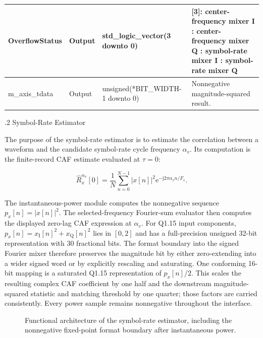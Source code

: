 \begin{table}[H]
\begin{center}
\begin{tabularx}{\textwidth}{|L{0.24\textwidth}|L{0.13\textwidth}|L{0.28\textwidth}|Y|}
\hline
OverflowStatus     & Output & std\_logic\_vector(3 \newline downto 0) & [3]: center-frequency mixer I \newline [2]: center-frequency mixer Q \newline [1]: symbol-rate mixer I \newline [0]: symbol-rate mixer Q \\
\hline
m\_axis\_tdata     & Output & unsigned(*BIT\_WIDTH-1 \newline downto 0) & Nonnegative magnitude-squared result. \\
\hline
\end{tabularx}
\end{center}
\end{table}

%
%
\bigskip
{}
.2  \quad Symbol-Rate Estimator

The purpose of the symbol-rate estimator is to estimate the correlation between a waveform and the candidate symbol-rate cycle frequency $\alpha_v$.  Its computation is the finite-record CAF estimate evaluated at $\tau=0$:

\begin{equation*}
\widehat{R}_{x}^{\alpha_v}[0] = \frac{1}{N} \sum_{n=0}^{N-1} |x[n]|^{2} \mathrm{e}^{-\mathrm{j}2\pi\alpha_v n/F_s}.
\end{equation*}

The instantaneous-power module computes the nonnegative sequence $p_x[n]=|x[n]|^{2}$.  The selected-frequency Fourier-sum evaluator then computes the displayed zero-lag CAF expression at $\alpha_v$.  For Q1.15 input components, $p_x[n]=x_{\mathrm{I}}[n]^2+x_{\mathrm{Q}}[n]^2$ lies in $[0,2]$ and has a full-precision unsigned 32-bit representation with 30 fractional bits.  The format boundary into the signed Fourier mixer therefore preserves the magnitude bit by either zero-extending into a wider signed word or by explicitly rescaling and saturating.  One conforming 16-bit mapping is a saturated Q1.15 representation of $p_x[n]/2$.  This scales the resulting complex CAF coefficient by one half and the downstream magnitude-squared statistic and matching threshold by one quarter; those factors are carried consistently.  Every power sample remains nonnegative throughout the interface.

\begin{figure}[H]
\begin{center}
\resizebox{\textwidth}{!}{}
\caption{Functional architecture of the symbol-rate estimator, including the nonnegative fixed-point format boundary after instantaneous power.}
\label{fig:sre}
\end{center}
\end{figure}

